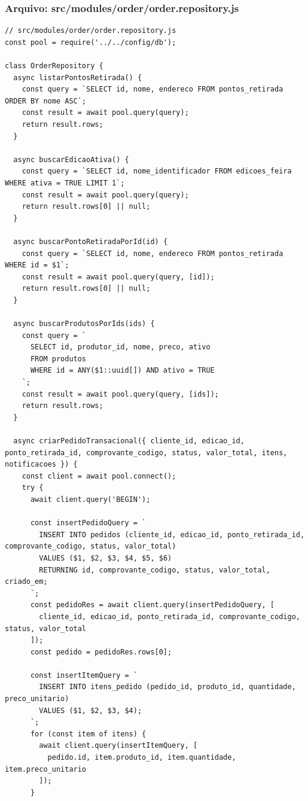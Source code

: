 \subsubsection*{Arquivo: src/modules/order/order.repository.js}
\begin{lstlisting}[caption={src/modules/order/order.repository.js}]
// src/modules/order/order.repository.js
const pool = require('../../config/db');

class OrderRepository {
  async listarPontosRetirada() {
    const query = `SELECT id, nome, endereco FROM pontos_retirada ORDER BY nome ASC`;
    const result = await pool.query(query);
    return result.rows;
  }

  async buscarEdicaoAtiva() {
    const query = `SELECT id, nome_identificador FROM edicoes_feira WHERE ativa = TRUE LIMIT 1`;
    const result = await pool.query(query);
    return result.rows[0] || null;
  }

  async buscarPontoRetiradaPorId(id) {
    const query = `SELECT id, nome, endereco FROM pontos_retirada WHERE id = $1`;
    const result = await pool.query(query, [id]);
    return result.rows[0] || null;
  }

  async buscarProdutosPorIds(ids) {
    const query = `
      SELECT id, produtor_id, nome, preco, ativo 
      FROM produtos 
      WHERE id = ANY($1::uuid[]) AND ativo = TRUE
    `;
    const result = await pool.query(query, [ids]);
    return result.rows;
  }

  async criarPedidoTransacional({ cliente_id, edicao_id, ponto_retirada_id, comprovante_codigo, status, valor_total, itens, notificacoes }) {
    const client = await pool.connect();
    try {
      await client.query('BEGIN');
      
      const insertPedidoQuery = `
        INSERT INTO pedidos (cliente_id, edicao_id, ponto_retirada_id, comprovante_codigo, status, valor_total)
        VALUES ($1, $2, $3, $4, $5, $6) 
        RETURNING id, comprovante_codigo, status, valor_total, criado_em;
      `;
      const pedidoRes = await client.query(insertPedidoQuery, [
        cliente_id, edicao_id, ponto_retirada_id, comprovante_codigo, status, valor_total
      ]);
      const pedido = pedidoRes.rows[0];

      const insertItemQuery = `
        INSERT INTO itens_pedido (pedido_id, produto_id, quantidade, preco_unitario)
        VALUES ($1, $2, $3, $4);
      `;
      for (const item of itens) {
        await client.query(insertItemQuery, [
          pedido.id, item.produto_id, item.quantidade, item.preco_unitario
        ]);
      }


\end{lstlisting}
